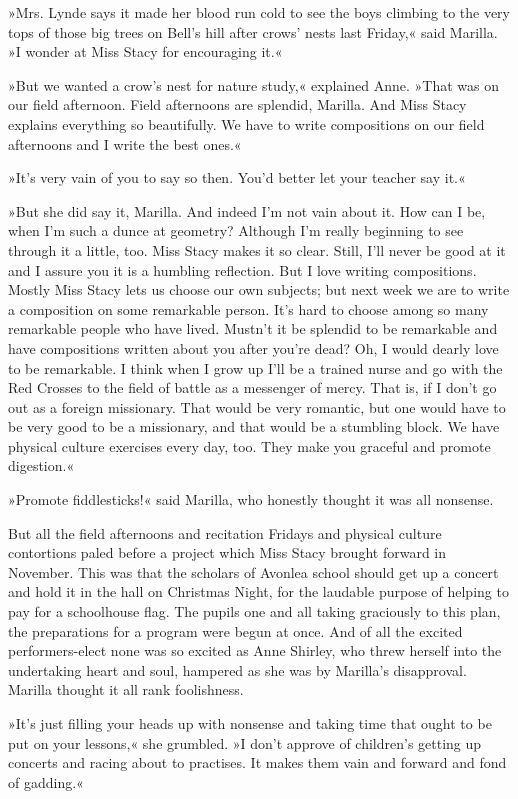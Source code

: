 »Mrs. Lynde says it made her blood run cold to see the boys climbing to the very tops of those big trees on Bell’s hill after crows’ nests last Friday,« said Marilla. »I wonder at Miss Stacy for encouraging it.«

»But we wanted a crow’s nest for nature study,« explained Anne. »That was on our field afternoon. Field afternoons are splendid, Marilla. And Miss Stacy explains everything so beautifully. We have to write compositions on our field afternoons and I write the best ones.«

»It’s very vain of you to say so then. You’d better let your teacher say it.«

»But she did say it, Marilla. And indeed I’m not vain about it. How can I be, when I’m such a dunce at geometry? Although I’m really beginning to see through it a little, too. Miss Stacy makes it so clear. Still, I’ll never be good at it and I assure you it is a humbling reflection. But I love writing compositions. Mostly Miss Stacy lets us choose our own subjects; but next week we are to write a composition on some remarkable person. It’s hard to choose among so many remarkable people who have lived. Mustn’t it be splendid to be remarkable and have compositions written about you after you’re dead? Oh, I would dearly love to be remarkable. I think when I grow up I’ll be a trained nurse and go with the Red Crosses to the field of battle as a messenger of mercy. That is, if I don’t go out as a foreign missionary. That would be very romantic, but one would have to be very good to be a missionary, and that would be a stumbling block. We have physical culture exercises every day, too. They make you graceful and promote digestion.«

»Promote fiddlesticks!« said Marilla, who honestly thought it was all nonsense.

But all the field afternoons and recitation Fridays and physical culture contortions paled before a project which Miss Stacy brought forward in November. This was that the scholars of Avonlea school should get up a concert and hold it in the hall on Christmas Night, for the laudable purpose of helping to pay for a schoolhouse flag. The pupils one and all taking graciously to this plan, the preparations for a program were begun at once. And of all the excited performers-elect none was so excited as Anne Shirley, who threw herself into the undertaking heart and soul, hampered as she was by Marilla’s disapproval. Marilla thought it all rank foolishness.

»It’s just filling your heads up with nonsense and taking time that ought to be put on your lessons,« she grumbled. »I don’t approve of children’s getting up concerts and racing about to practises. It makes them vain and forward and fond of gadding.«

